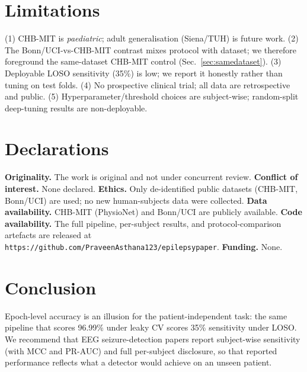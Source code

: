 \documentclass[10pt,journal,twocolumn]{IEEEtran}
\begin{document}
\section{Limitations}
(1) CHB-MIT is \emph{paediatric}; adult generalisation (Siena/TUH) is future work. (2) The Bonn/UCI-vs-CHB-MIT contrast mixes protocol with dataset; we therefore foreground the same-dataset CHB-MIT control (Sec.~\ref{sec:samedataset}). (3) Deployable LOSO sensitivity (35\%) is low; we report it honestly rather than tuning on test folds. (4) No prospective clinical trial; all data are retrospective and public. (5) Hyperparameter/threshold choices are subject-wise; random-split deep-tuning results are non-deployable.

\section{Declarations}
\textbf{Originality.} The work is original and not under concurrent review. \textbf{Conflict of interest.} None declared. \textbf{Ethics.} Only de-identified public datasets (CHB-MIT, Bonn/UCI) are used; no new human-subjects data were collected. \textbf{Data availability.} CHB-MIT (PhysioNet) and Bonn/UCI are publicly available. \textbf{Code availability.} The full pipeline, per-subject results, and protocol-comparison artefacts are released at \texttt{https://github.com/PraveenAsthana123/epilepsypaper}. \textbf{Funding.} None.





\section{Conclusion}
Epoch-level accuracy is an illusion for the patient-independent task: the same pipeline that scores 96.99\% under leaky CV scores 35\% sensitivity under LOSO. We recommend that EEG seizure-detection papers report subject-wise sensitivity (with MCC and PR-AUC) and full per-subject disclosure, so that reported performance reflects what a detector would achieve on an unseen patient.

\small
\end{document}
